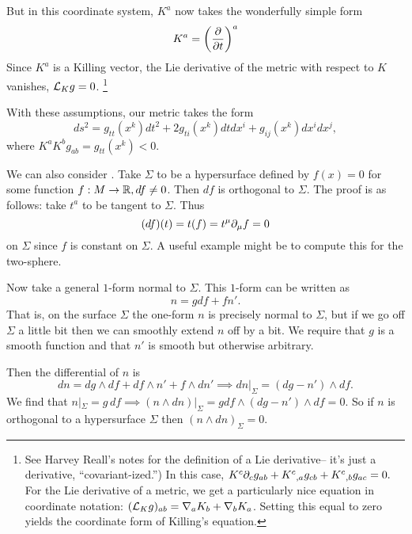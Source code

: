 But in this coordinate system, $K^a$ now takes the wonderfully simple form \begin{equation*}
    K^a= \left(\P{}{t}\right)^a
\end{equation*}
Since $K^a$ is a Killing vector, the Lie derivative of the metric with respect to $K$ vanishes,
$\cL_K g=0$.%
    \footnote{See Harvey Reall's notes for the definition of a Lie derivative-- it's just a derivative, ``covariant-ized.'') In this case, $K^c \p_c g_{ab}+K^c{}_{,a} g_{cb}+K^c{}_{,b}g_{ac}=0.$ For the Lie derivative of a metric, we get a particularly nice equation in coordinate notation: $(\cL_K g)_{ab}=\nabla_a K_b + \nabla_b K_a$. Setting this equal to zero yields the coordinate form of Killing's equation.
    }

With these assumptions, our metric takes the form
\begin{equation*}
    ds^2 = g_{tt}(x^k)dt^2 +2g_{ti}(x^k) dt dx^i+ g_{ij}(x^k)dx^i dx^j,
\end{equation*}
where $K^a K^b g_{ab}=g_{tt}(x^k)<0$.

We can also consider . Take $\Sigma$ to be a hypersurface defined by $f(x)=0$ for some function $f:M\to \RR, df\neq 0$. Then $df$ is orthogonal to $\Sigma$. The proof is as follows: take $t^a$ to be tangent to $\Sigma$. Thus
\begin{equation*}
    (df)(t)=t(f)=t^\mu \p_\mu f = 0
\end{equation*}
on $\Sigma$ since $f$ is constant on $\Sigma.$ A useful example might be to compute this for the two-sphere.

Now take a general $1$-form normal to $\Sigma$. This $1$-form can be written as
\begin{equation}
    n= gdf +f n'.
\end{equation}
That is, on the surface $\Sigma$ the one-form $n$ is precisely normal to $\Sigma$, but if we go off $\Sigma$ a little bit then we can smoothly extend $n$ off by a bit. We require that $g$ is a smooth function and that $n'$ is smooth but otherwise arbitrary.

Then the differential of $n$ is
\begin{equation*}
    dn=dg\wedge df + df \wedge n' + f \wedge dn' \implies dn|_\Sigma = (dg-n') \wedge df.
\end{equation*}
We find that $n|_\Sigma= g\, df \implies (n\wedge dn)|_\Sigma = gdf \wedge (dg-n') \wedge df =0$. So if $n$ is orthogonal to a hypersurface $\Sigma$ then $(n\wedge dn)_\Sigma =0$.


